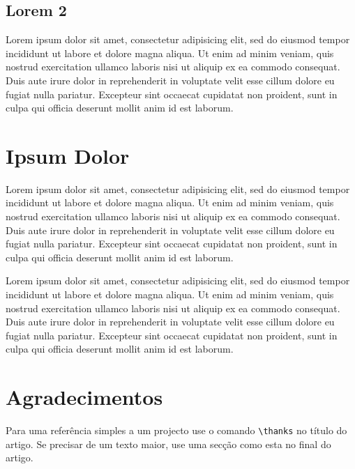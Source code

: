 \documentclass[a4paper, twocolumn, 11pt, twoside]{article}
\begin{document}
\subsection{Lorem 2}

Lorem ipsum dolor sit amet, consectetur adipisicing elit, sed do eiusmod
tempor incididunt ut labore et dolore magna aliqua. Ut enim ad minim
veniam, quis nostrud exercitation ullamco laboris nisi ut aliquip ex ea
commodo consequat. Duis aute irure dolor in reprehenderit in voluptate
velit esse cillum dolore eu fugiat nulla pariatur. Excepteur sint
occaecat cupidatat non proident, sunt in culpa qui officia deserunt
mollit anim id est laborum.

\section{Ipsum Dolor}

Lorem ipsum dolor sit amet, consectetur adipisicing elit, sed do eiusmod
tempor incididunt ut labore et dolore magna aliqua. Ut enim ad minim
veniam, quis nostrud exercitation ullamco laboris nisi ut aliquip ex ea
commodo consequat. Duis aute irure dolor in reprehenderit in voluptate
velit esse cillum dolore eu fugiat nulla pariatur. Excepteur sint
occaecat cupidatat non proident, sunt in culpa qui officia deserunt
mollit anim id est laborum.

Lorem ipsum dolor sit amet, consectetur adipisicing elit, sed do eiusmod
tempor incididunt ut labore et dolore magna aliqua. Ut enim ad minim
veniam, quis nostrud exercitation ullamco laboris nisi ut aliquip ex ea
commodo consequat. Duis aute irure dolor in reprehenderit in voluptate
velit esse cillum dolore eu fugiat nulla pariatur. Excepteur sint
occaecat cupidatat non proident, sunt in culpa qui officia deserunt
mollit anim id est laborum.

\section*{Agradecimentos}

Para uma referência simples a um projecto use o comando
\verb.\thanks. no título do artigo. Se precisar de um texto maior, use
uma secção como esta no final do artigo.







\end{document}
